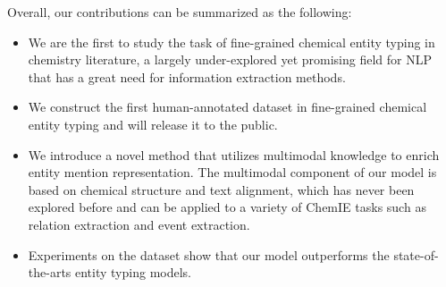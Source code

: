 




Overall, our contributions can be summarized as the following:



\begin{itemize}
    \item We are the first to study the task of fine-grained chemical entity typing in chemistry literature, a largely under-explored yet promising field for NLP that has a great need for information extraction methods.
    \item We construct the first human-annotated dataset in  fine-grained chemical entity typing and will release it to the public.
    \item We introduce a novel method that utilizes multimodal knowledge to enrich entity mention representation. The multimodal component of our model is based on chemical structure and text alignment, which has never been explored before and can be applied to a variety of ChemIE tasks such as relation extraction and event extraction.
    \item Experiments on the dataset show that our model outperforms the state-of-the-arts entity typing models. 
\end{itemize}







